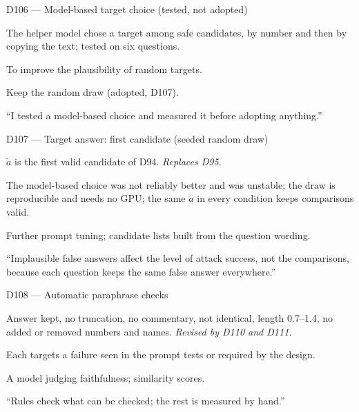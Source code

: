 \documentclass[11pt,a4paper]{report}
\begin{document}
\begin{decisionbox}{D106 --- Model-based target choice (tested, not adopted)}
\begin{description}[nosep, leftmargin=0pt]
  \item[Decision.] The helper model chose a target among safe candidates, by number and then by copying the text; tested on six questions.
  \item[Why.] To improve the plausibility of random targets.
  \item[Alternatives.] Keep the random draw (adopted, D107).
  \item[Interview line.] ``I tested a model-based choice and measured it before adopting anything.''
\end{description}
\end{decisionbox}

\begin{decisionbox}{D107 --- Target answer: first candidate (seeded random draw)}
\begin{description}[nosep, leftmargin=0pt]
  \item[Decision.] $\tilde{a}$ is the first valid candidate of D94. \emph{Replaces D95.}
  \item[Why.] The model-based choice was not reliably better and was unstable; the draw is reproducible and needs no GPU; the same $\tilde{a}$ in every condition keeps comparisons valid.
  \item[Alternatives.] Further prompt tuning; candidate lists built from the question wording.
  \item[Interview line.] ``Implausible false answers affect the level of attack success, not the comparisons, because each question keeps the same false answer everywhere.''
\end{description}
\end{decisionbox}

\begin{decisionbox}{D108 --- Automatic paraphrase checks}
\begin{description}[nosep, leftmargin=0pt]
  \item[Decision.] Answer kept, no truncation, no commentary, not identical, length 0.7--1.4, no added or removed numbers and names. \emph{Revised by D110 and D111.}
  \item[Why.] Each targets a failure seen in the prompt tests or required by the design.
  \item[Alternatives.] A model judging faithfulness; similarity scores.
  \item[Interview line.] ``Rules check what can be checked; the rest is measured by hand.''
\end{description}
\end{decisionbox}
\end{document}

